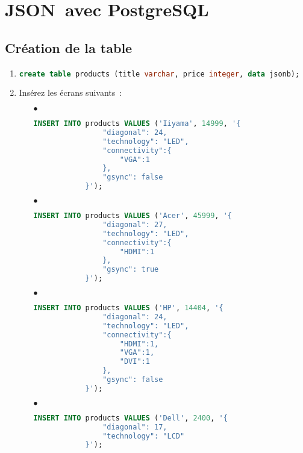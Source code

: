\documentclass[a4paper,10pt]{article}
\begin{document}
\section{JSON avec PostgreSQL}

  \subsection{Création de la table}
    \begin{enumerate}
      \item
      \begin{lstlisting}[language=SQL, basicstyle=\ttfamily, gobble=6, tabsize=2]
      create table products (title varchar, price integer, data jsonb);
      \end{lstlisting}
      \item Insérez les écrans suivants :
          \begin{itemize}
            \item[$\bullet$]
            \begin{lstlisting}[language=SQL, basicstyle=\ttfamily, gobble=12, tabsize=2, showstringspaces=false]
            INSERT INTO products VALUES ('Iiyama', 14999, '{
                "diagonal": 24,
                "technology": "LED",
                "connectivity":{
                    "VGA":1
                },
                "gsync": false
            }');
            \end{lstlisting}
            \item[$\bullet$]
            \begin{lstlisting}[language=SQL, basicstyle=\ttfamily, gobble=12, tabsize=2, showstringspaces=false]
            INSERT INTO products VALUES ('Acer', 45999, '{
                "diagonal": 27,
                "technology": "LED",
                "connectivity":{
                    "HDMI":1
                },
                "gsync": true
            }');
            \end{lstlisting}
            \item[$\bullet$]
            \begin{lstlisting}[language=SQL, basicstyle=\ttfamily, gobble=12, tabsize=2, showstringspaces=false]
            INSERT INTO products VALUES ('HP', 14404, '{
                "diagonal": 24,
                "technology": "LED",
                "connectivity":{
                    "HDMI":1,
                    "VGA":1,
                    "DVI":1
                },
                "gsync": false
            }');
            \end{lstlisting}
            \item[$\bullet$]
            \begin{lstlisting}[language=SQL, basicstyle=\ttfamily, gobble=12, tabsize=2, showstringspaces=false]
            INSERT INTO products VALUES ('Dell', 2400, '{
                "diagonal": 17,
                "technology": "LCD"
            }');
            \end{lstlisting}
         \end{itemize}
    \end{enumerate}
\end{document}
